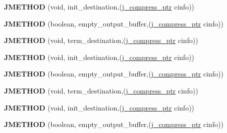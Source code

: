 \begin{DoxyCompactItemize}
\item 
\mbox{\label{structjpeg__destination__mgr_ae29d14eb632140c7c67eda8c5824383c}} 
{\bfseries J\+M\+E\+T\+H\+OD} (void, init\+\_\+destination,(\hyperlink{structjpeg__compress__struct}{j\+\_\+compress\+\_\+ptr} cinfo))
\item 
\mbox{\label{structjpeg__destination__mgr_a7357b5d5cab543cfa243dd59f101b8f2}} 
{\bfseries J\+M\+E\+T\+H\+OD} (boolean, empty\+\_\+output\+\_\+buffer,(\hyperlink{structjpeg__compress__struct}{j\+\_\+compress\+\_\+ptr} cinfo))
\item 
\mbox{\label{structjpeg__destination__mgr_a1158df5e49ecfa2a7d0905eef216afbf}} 
{\bfseries J\+M\+E\+T\+H\+OD} (void, term\+\_\+destination,(\hyperlink{structjpeg__compress__struct}{j\+\_\+compress\+\_\+ptr} cinfo))
\item 
\mbox{\label{structjpeg__destination__mgr_ae29d14eb632140c7c67eda8c5824383c}} 
{\bfseries J\+M\+E\+T\+H\+OD} (void, init\+\_\+destination,(\hyperlink{structjpeg__compress__struct}{j\+\_\+compress\+\_\+ptr} cinfo))
\item 
\mbox{\label{structjpeg__destination__mgr_a7357b5d5cab543cfa243dd59f101b8f2}} 
{\bfseries J\+M\+E\+T\+H\+OD} (boolean, empty\+\_\+output\+\_\+buffer,(\hyperlink{structjpeg__compress__struct}{j\+\_\+compress\+\_\+ptr} cinfo))
\item 
\mbox{\label{structjpeg__destination__mgr_a1158df5e49ecfa2a7d0905eef216afbf}} 
{\bfseries J\+M\+E\+T\+H\+OD} (void, term\+\_\+destination,(\hyperlink{structjpeg__compress__struct}{j\+\_\+compress\+\_\+ptr} cinfo))
\item 
\mbox{\label{structjpeg__destination__mgr_ae29d14eb632140c7c67eda8c5824383c}} 
{\bfseries J\+M\+E\+T\+H\+OD} (void, init\+\_\+destination,(\hyperlink{structjpeg__compress__struct}{j\+\_\+compress\+\_\+ptr} cinfo))
\item 
\mbox{\label{structjpeg__destination__mgr_a7357b5d5cab543cfa243dd59f101b8f2}} 
{\bfseries J\+M\+E\+T\+H\+OD} (boolean, empty\+\_\+output\+\_\+buffer,(\hyperlink{structjpeg__compress__struct}{j\+\_\+compress\+\_\+ptr} cinfo))

\end{DoxyCompactItemize}
